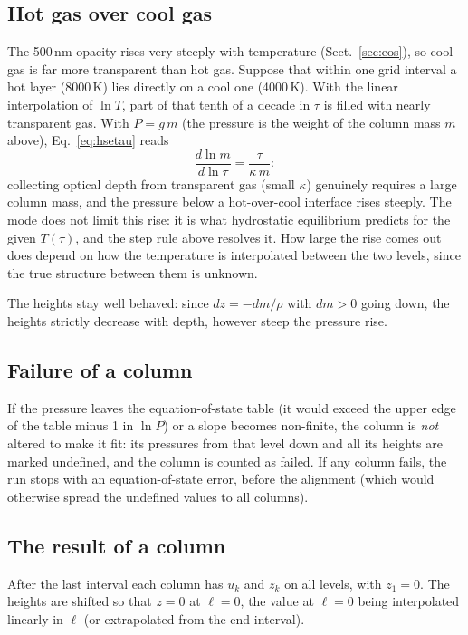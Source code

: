 \subsection{Hot gas over cool gas}\label{sec:cap}
The 500\,nm opacity rises very steeply with temperature (Sect.~\ref{sec:eos}), so cool gas is far more transparent than hot
gas. Suppose that within one grid interval a hot layer (8000\,K) lies directly on a cool one (4000\,K). With the linear
interpolation of $\ln T$, part of that tenth of a decade in $\tau$ is filled with nearly transparent gas. With $P=g\,m$
(the pressure is the weight of the column mass $m$ above), Eq.~\eqref{eq:hsetau} reads
\begin{equation}
\frac{d\ln m}{d\ln\tau}=\frac{\tau}{\kappa\,m}:
\end{equation}
collecting optical depth from transparent gas (small $\kappa$) genuinely requires a large column mass, and the pressure
below a hot-over-cool interface rises steeply. The mode does not limit this rise: it is what hydrostatic equilibrium
predicts for the given $T(\tau)$, and the step rule above resolves it. How large the rise comes out does depend on how the
temperature is interpolated between the two levels, since the true structure between them is unknown.

The heights stay well behaved: since $dz=-dm/\rho$ with $dm>0$ going down, the heights strictly decrease with depth, however
steep the pressure rise.

\subsection{Failure of a column}
If the pressure leaves the equation-of-state table (it would exceed the upper edge of the table minus 1 in $\ln P$) or a
slope becomes non-finite, the column is \emph{not} altered to make it fit: its pressures from that level down and all its
heights are marked undefined, and the column is counted as failed. If any column fails, the run stops with an
equation-of-state error, before the alignment (which would otherwise spread the undefined values to all columns).

\subsection{The result of a column}
After the last interval each column has $u_k$ and $z_k$ on all levels, with $z_1=0$. The heights are shifted so that $z=0$ at
$\ell=0$, the value at $\ell=0$ being interpolated linearly in $\ell$ (or extrapolated from the end interval).

